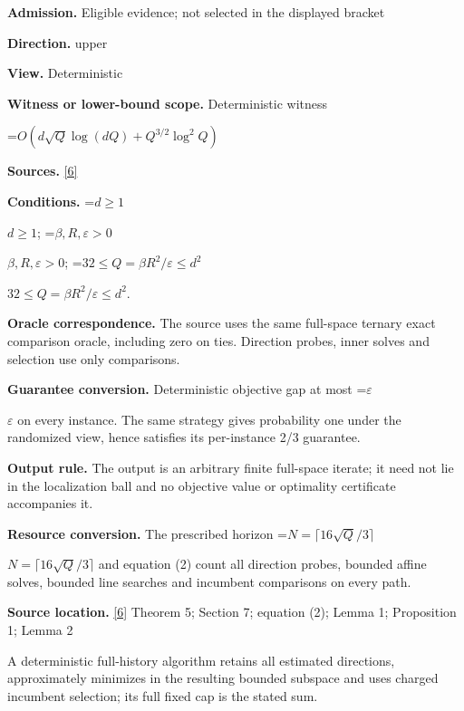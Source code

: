 \documentclass[10pt,a4paper]{article}
\newcommand{\AtlasMath}[1]{\par\begingroup\centering\setbox0=\hbox{$\displaystyle #1$}\ifdim\wd0>1.4\linewidth\typeout{ATLAS WIDE FORMULA: \the\wd0}\fi\ifdim\wd0>\linewidth\resizebox{\linewidth}{!}{\box0}\else\box0\fi\par\endgroup}
\newcommand{\AtlasInlineMath}[1]{\begingroup\setbox0=\hbox{$#1$}\ifdim\wd0>.4\linewidth\endgroup\AtlasMath{#1}\else\endgroup$#1$\fi}
\begin{document}
\textbf{Admission.} Eligible evidence; not selected in the displayed bracket



\textbf{Direction.} upper



\textbf{View.} Deterministic



\textbf{Witness or lower-bound scope.} Deterministic witness



\AtlasMath{O\!\left(d\sqrt Q\log(dQ)+Q^{3/2}\log^2 Q\right)}


\textbf{Sources.} \href{https://github.com/WU-Wendao/Colombo/blob/main/colombo_sensorium/Complexity_altas/data/sources/colombo/COLOMBO_KIMI_002/kimi_002.pdf}{[6]}



\textbf{Conditions.} \AtlasInlineMath{d\ge1}; \AtlasInlineMath{\beta,R,\varepsilon>0}; \AtlasInlineMath{32\le Q=\beta R^2/\varepsilon\le d^2}.



\textbf{Oracle correspondence.} The source uses the same full-space ternary exact comparison oracle, including zero on ties. Direction probes, inner solves and selection use only comparisons.



\textbf{Guarantee conversion.} Deterministic objective gap at most \AtlasInlineMath{\varepsilon} on every instance. The same strategy gives probability one under the randomized view, hence satisfies its per-instance 2/3 guarantee.



\textbf{Output rule.} The output is an arbitrary finite full-space iterate; it need not lie in the localization ball and no objective value or optimality certificate accompanies it.



\textbf{Resource conversion.} The prescribed horizon \AtlasInlineMath{N=\lceil16\sqrt Q/3\rceil} and equation (2) count all direction probes, bounded affine solves, bounded line searches and incumbent comparisons on every path.



\textbf{Source location.} \href{https://github.com/WU-Wendao/Colombo/blob/main/colombo_sensorium/Complexity_altas/data/sources/colombo/COLOMBO_KIMI_002/kimi_002.pdf}{[6]} Theorem 5; Section 7; equation (2); Lemma 1; Proposition 1; Lemma 2



A deterministic full-history algorithm retains all estimated directions, approximately minimizes in the resulting bounded subspace and uses charged incumbent selection; its full fixed cap is the stated sum.
\end{document}
